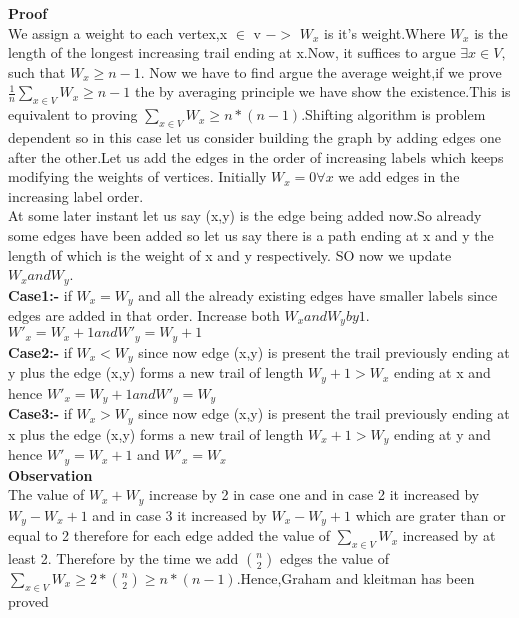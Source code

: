 \textbf{Proof}\\
We assign a weight to each vertex,x $\in$ v $->$ $W_x$ is it's weight.Where $W_x$ is the length of the longest increasing trail ending at x.Now, it suffices to argue $\exists x \in V,$such that $W_x\geq n-1$. Now we have to find argue the average weight,if we prove $\frac{1}{n}\sum_{x \in V} W_x \geq n-1$
the by averaging principle we have show the existence.This is equivalent to proving $\sum_{x \in V} W_x \geq n*(n-1)$.Shifting algorithm is problem dependent so in this case let us consider building the graph by adding edges one after the other.Let us add the edges in the order of increasing labels which keeps modifying the weights of vertices.
Initially $W_x = 0 \forall x$ we add edges in the increasing label order.\\
At some later instant let us say (x,y) is the edge being added now.So already some edges have been added so let us say there is a path ending at x and y the length of which is the weight of x and y respectively. SO now we update $W_x and W_y$.\\
\textbf{Case1:-} if
$W_x=W_y$  and all the already existing edges have smaller labels since edges are added in that order. Increase both $W_x and W_y by 1$.$W'_x=W_x+1 and W'_y=W_y+1$\\
\textbf{Case2:-}
if $W_x<W_y$ since now edge (x,y) is present the trail previously ending at y plus the edge (x,y) forms a new trail of length $W_y+1 >W_x$  ending at x and hence $W'_x=W_y+1 and W'_y=W_y$\\
\textbf{Case3:-}
if $W_x>W_y$ since now edge (x,y) is present the trail previously ending at x plus the edge (x,y) forms a new trail of length  $W_x+1 >W_y$ ending at y and hence $W'_y=W_x+1$ and $W'_x=W_x$\\
\newpage
\textbf{Observation}\\
The value of $W_x+W_y$ increase by 2 in case one and in case 2 it increased by $W_y-W_x+1$ and in case 3 it increased by  $W_x-W_y+1$ which are grater than or equal to 2 therefore for each edge added the value of $\sum_{x \in V} W_x$ increased by at least 2. Therefore by the time we add ${n \choose 2}$ edges the value of  $\sum_{x \in V} W_x \geq 2*{n \choose 2} \geq n*(n-1) $.Hence,Graham and kleitman has been proved








